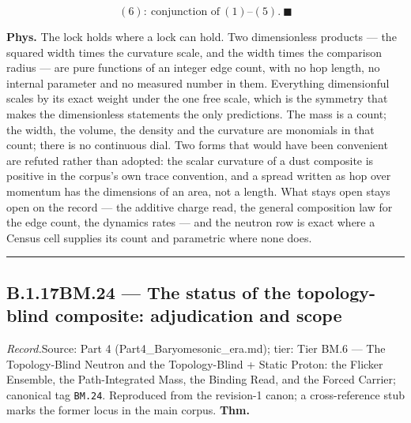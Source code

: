 \documentclass[11pt,openany]{report}
\theoremstyle{canonplain}
\theoremstyle{canondef}
\begin{document}
\[
(6):\ \text{conjunction of}\ (1)\text{–}(5).\ \blacksquare
\]

\textbf{Phys.} The lock holds where a lock can hold. Two dimensionless products — the squared width times the curvature scale, and the width times the comparison radius — are pure functions of an integer edge count, with no hop length, no internal parameter and no measured number in them. Everything dimensionful scales by its exact weight under the one free scale, which is the symmetry that makes the dimensionless statements the only predictions. The mass is a count; the width, the volume, the density and the curvature are monomials in that count; there is no continuous dial. Two forms that would have been convenient are refuted rather than adopted: the scalar curvature of a dust composite is positive in the corpus's own trace convention, and a spread written as hop over momentum has the dimensions of an area, not a length. What stays open stays open on the record — the additive charge read, the general composition law for the edge count, the dynamics rates — and the neutron row is exact where a Census cell supplies its count and parametric where none does.

\vspace{2pt}\noindent\rule{\textwidth}{0.4pt}\vspace{2pt}

\medskip
\subsection*{\texorpdfstring{B.1.17\quad BM.24 — The status of the topology-blind composite: adjudication and scope}{BM.24 B.1.17}}
\label{tag:BM-24}
{\small \textit{Record.}\quad Source: Part 4 (Part4\_Baryomesonic\_era.md); tier: Tier BM.6 — The Topology-Blind Neutron and the Topology-Blind + Static Proton: the Flicker Ensemble, the Path-Integrated Mass, the Binding Read, and the Forced Carrier; canonical tag \texttt{BM.24}. Reproduced from the revision-1 canon; a cross-reference stub marks the former locus in the main corpus.}
\medskip
\textbf{Thm.}
\end{document}
